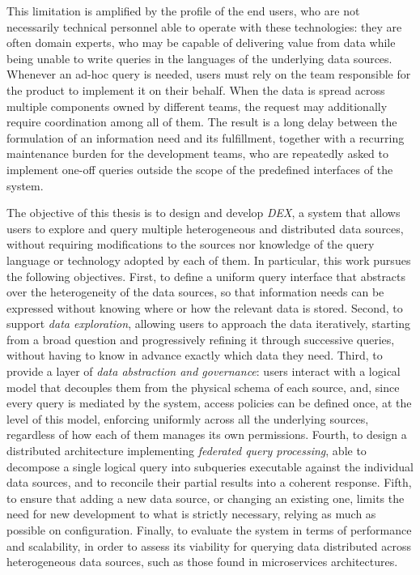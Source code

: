 This limitation is amplified by the profile of the end users, who are not
necessarily technical personnel able to operate with these technologies: they
are often domain experts, who may be capable of delivering value from data while
being unable to write queries in the languages of the underlying data sources.
Whenever an ad-hoc query is needed, users must rely on the team responsible for
the product to implement it on their behalf. When the data is spread across
multiple components owned by different teams, the request may additionally
require coordination among all of them. The result is a long delay between the
formulation of an information need and its fulfillment, together with a
recurring maintenance burden for the development teams, who are repeatedly asked
to implement one-off queries outside the scope of the predefined interfaces of
the system. 

The objective of this thesis is to design and develop \textit{DEX}, a system
that allows users to explore and query multiple heterogeneous and distributed
data sources, without requiring modifications to the sources nor knowledge of
the query language or technology adopted by each of them.
In particular, this work pursues the following objectives. First, to define a
uniform query interface that abstracts over the heterogeneity of the data
sources, so that information needs can be expressed without knowing where or how
the relevant data is stored. Second, to support \textit{data exploration},
allowing users to approach the data iteratively, starting from a broad question
and progressively refining it through successive queries, without having to know
in advance exactly which data they need. Third, to provide a layer of
\textit{data abstraction and governance}: users interact with a logical model
that decouples them from the physical schema of each source, and, since every
query is mediated by the system, access policies can be defined once, at the
level of this model, enforcing uniformly across all the underlying sources,
regardless of how each of them manages its own permissions. Fourth, to design a
distributed architecture implementing \textit{federated query processing}, able
to decompose a single logical query into subqueries executable against the
individual data sources, and to reconcile their partial results into a coherent
response. Fifth, to ensure that adding a new data source, or changing an
existing one, limits the need for new development to what is strictly necessary,
relying as much as possible on configuration. Finally, to evaluate the system in
terms of performance and scalability, in order to assess its viability for
querying data distributed across heterogeneous data sources, such as those found
in microservices architectures. 

